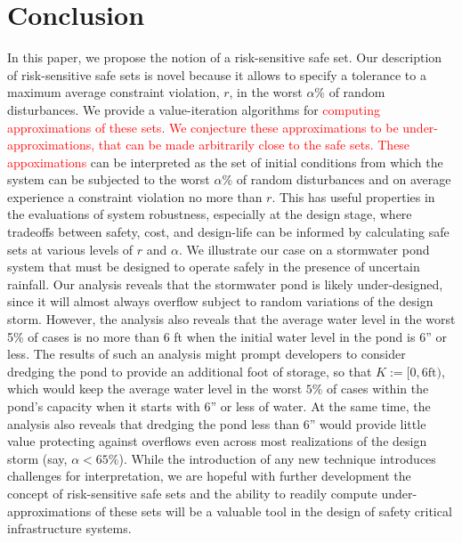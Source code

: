 \documentclass[letterpaper, 10 pt, conference]{ieeeconf}  %
\begin{document}
\section{Conclusion}\label{conc}
In this paper, we propose the notion of a risk-sensitive safe set. Our description of risk-sensitive safe sets is novel because it allows to specify a tolerance to a maximum average constraint violation, $r$, in the worst $\alpha\%$ of random disturbances. We provide a value-iteration algorithms for \textcolor{red}{computing approximations of these sets. We conjecture these approximations to be under-approximations, that can be made arbitrarily close to the safe sets. These appoximations} can be interpreted as the set of initial conditions from which the system can be subjected to the worst $\alpha\%$ of random disturbances and on average experience a constraint violation no more than $r$. This has useful properties in the evaluations of system robustness, especially at the design stage, where tradeoffs between safety, cost, and design-life can be informed by calculating safe sets at various levels of $r$ and $\alpha$. We illustrate our case on a stormwater pond system that must be designed to operate safely in the presence of uncertain rainfall. Our analysis reveals that the stormwater pond is likely under-designed, since it will almost always overflow subject to random variations of the design storm. However, the analysis also reveals that the average water level in the worst 5\% of cases is no more than $6$ ft when the initial water level in the pond is $6$” or less. The results of such an analysis might prompt developers to consider dredging the pond to provide an additional foot of storage, so that $K :=[0,6\text{ft})$, which would keep the average water level in the worst $5\%$ of cases within the pond’s capacity when it starts with $6$” or less of water. At the same time, the analysis also reveals that dredging the pond less than 6” would provide little value protecting against overflows even across most realizations of the design storm (say, $\alpha < 65\%$). While the introduction of any new technique introduces challenges for interpretation, we are hopeful with further development the concept of risk-sensitive safe sets and the ability to readily compute under-approximations of these sets will be a valuable tool in the design of safety critical infrastructure systems. 

\end{document}
